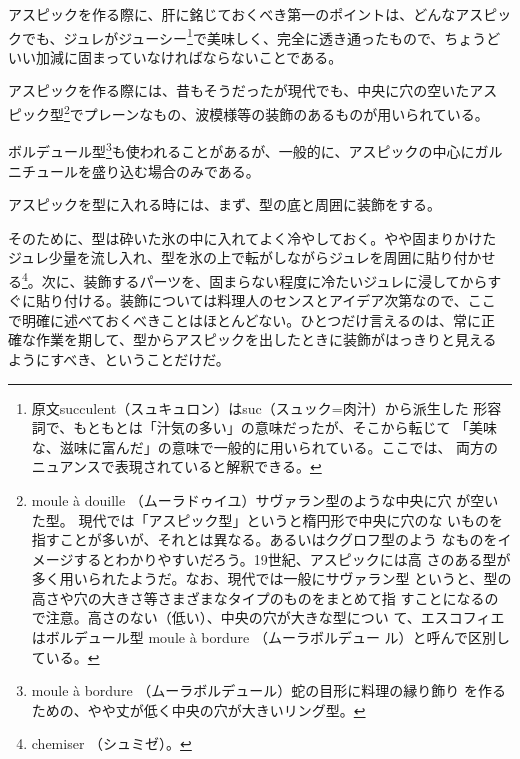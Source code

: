 

アスピックを作る際に、肝に銘じておくべき第一のポイントは、どんなアスピッ
クでも、ジュレがジューシー\footnote{原文succulent（スュキュロン）はsuc（スュック=肉汁）から派生した
  形容詞で、もともとは「汁気の多い」の意味だったが、そこから転じて
  「美味な、滋味に富んだ」の意味で一般的に用いられている。ここでは、
  両方のニュアンスで表現されていると解釈できる。}で美味しく、完全に透き通ったもので、ちょうど
いい加減に固まっていなければならないことである。

アスピックを作る際には、昔もそうだったが現代でも、中央に穴の空いたアス
ピック型\footnote{moule à douille
  （ムーラドゥイユ）サヴァラン型のような中央に穴 が空いた型。
  現代では「アスピック型」というと楕円形で中央に穴のな
  いものを指すことが多いが、それとは異なる。あるいはクグロフ型のよう
  なものをイメージするとわかりやすいだろう。19世紀、アスピックには高
  さのある型が多く用いられたようだ。なお、現代では一般にサヴァラン型
  というと、型の高さや穴の大きさ等さまざまなタイプのものをまとめて指
  すことになるので注意。高さのない（低い）、中央の穴が大きな型につい
  て、エスコフィエはボルデュール型 moule à bordure （ムーラボルデュー
  ル）と呼んで区別している。}でプレーンなもの、波模様等の装飾のあるものが用いられている。

ボルデュール型\footnote{moule à bordure
  （ムーラボルデュール）蛇の目形に料理の縁り飾り
  を作るための、やや丈が低く中央の穴が大きいリング型。}も使われることがあるが、一般的に、アスピックの中心にガル
ニチュールを盛り込む場合のみである。

アスピックを型に入れる時には、まず、型の底と周囲に装飾をする。

そのために、型は砕いた氷の中に入れてよく冷やしておく。やや固まりかけた
ジュレ少量を流し入れ、型を氷の上で転がしながらジュレを周囲に貼り付かせ
る\footnote{chemiser （シュミゼ）。}。次に、装飾するパーツを、固まらない程度に冷たいジュレに浸してからす
ぐに貼り付ける。装飾については料理人のセンスとアイデア次第なので、ここ
で明確に述べておくべきことはほとんどない。ひとつだけ言えるのは、常に正
確な作業を期して、型からアスピックを出したときに装飾がはっきりと見える
ようにすべき、ということだけだ。

